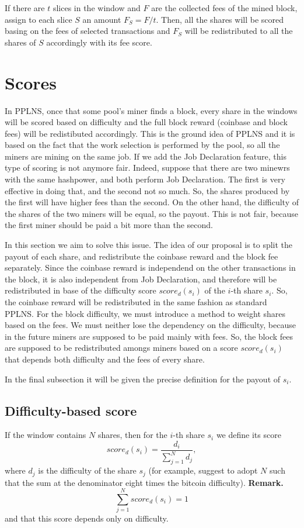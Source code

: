 \documentclass[11pt]{article} %
\begin{document}
If there are $t$ slices in the window and $F$ are the collected fees of the mined block, assign to each slice $S$ an amount $F_S = F/t$. Then, all the shares will be scored basing on the fees of selected transactions and $F_S$ will be redistributed to all the shares of $S$ accordingly with its fee score.

\section{Scores}
In PPLNS, once that some pool's miner finds a block, every share in the windows will be scored based on difficulty and the full block reward (coinbase and block fees) will be redistibuted accordingly. This is the ground idea of PPLNS and it is based on the fact that the work selection is performed by the pool, so all the miners are mining on the same job. If we add the Job Declaration feature, this type of scoring is not anymore fair. Indeed, suppose that there are two minewrs with the same hashpower, and both perform Job Declaration. The first is very effective in doing that, and the second not so much. So, the shares produced by the first will have higher fees than the second. On the other hand, the difficulty of the shares of the two miners will be equal, so the payout. This is not fair, because the first miner should be paid a bit more than the second.

In this section we aim to solve this issue. The idea of our proposal is to split the payout of each share, and redistribute the coinbase reward and the block fee separately. Since the coinbase reward is independend on the other transactions in the block, it is also independent from Job Declaration, and therefore will be redistributed in base of the difficulty score $score_d(s_i)$ of the $i$-th share $s_i$. So, the coinbase reward will be redistributed in the same fashion as standard PPLNS. \newline
For the block difficulty, we must introduce a method to weight shares based on the fees. We must neither lose the dependency on the difficulty, because in the future miners are supposed to be paid mainly with fees. So, the block fees are supposed to be redistributed amongs miners based on a score $score_d(s_i)$ that depends both difficulty and the fees of every share.

In the final subsection it will be given the precise definition for the payout of $s_i$.

\subsection{Difficulty-based score}
If the window contains $N$ shares, then for the $i$-th share $s_i$ we define its score
\[score_d(s_i) = \frac{d_i}{\sum_{j=1}^Nd_j},\]
where $d_j$ is the difficulty of the share $s_j$ (for example, \cite{ocean} suggest to adopt $N$ such that the sum at the denominator eight times the bitcoin difficulty).\newline
\textbf{Remark.} 
\[\sum_{j=1}^N score_d(s_i) = 1\] and that this score depends only on difficulty.
\end{document}
